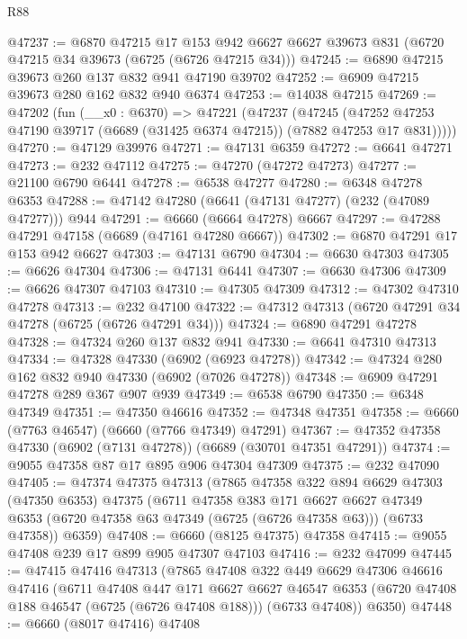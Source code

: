 \begin{lexlean}{R88}
\begin{coremodule}
@47237 := @6870
    @47215
    @17
    @153
    @942
    @6627
    @6627
    @39673
    @831
    (@6720 @47215 @34 @39673 (@6725 (@6726 @47215 @34)))
@47245 := @6890 @47215 @39673 @260 @137 @832 @941 @47190 @39702
@47252 := @6909 @47215 @39673 @280 @162 @832 @940 @6374
@47253 := @14038 @47215
@47269 := @47202
    (fun (__x0 : @6370) =>
    @47221
      (@47237
        (@47245
          (@47252 @47253 @47190 @39717 (@6689 (@31425 @6374 @47215)) (@7882 @47253 @17 @831)))))
@47270 := @47129 @39976
@47271 := @47131 @6359
@47272 := @6641 @47271
@47273 := @232 @47112
@47275 := @47270 (@47272 @47273)
@47277 := @21100 @6790 @6441
@47278 := @6538 @47277
@47280 := @6348 @47278 @6353
@47288 := @47142 @47280 (@6641 (@47131 @47277) (@232 (@47089 @47277))) @944
@47291 := @6660 (@6664 @47278) @6667
@47297 := @47288 @47291 @47158 (@6689 (@47161 @47280 @6667))
@47302 := @6870 @47291 @17 @153 @942 @6627
@47303 := @47131 @6790
@47304 := @6630 @47303
@47305 := @6626 @47304
@47306 := @47131 @6441
@47307 := @6630 @47306
@47309 := @6626 @47307 @47103
@47310 := @47305 @47309
@47312 := @47302 @47310 @47278
@47313 := @232 @47100
@47322 := @47312 @47313 (@6720 @47291 @34 @47278 (@6725 (@6726 @47291 @34)))
@47324 := @6890 @47291 @47278
@47328 := @47324 @260 @137 @832 @941
@47330 := @6641 @47310 @47313
@47334 := @47328 @47330 (@6902 (@6923 @47278))
@47342 := @47324 @280 @162 @832 @940 @47330 (@6902 (@7026 @47278))
@47348 := @6909 @47291 @47278 @289 @367 @907 @939
@47349 := @6538 @6790
@47350 := @6348 @47349
@47351 := @47350 @46616
@47352 := @47348 @47351
@47358 := @6660 (@7763 @46547) (@6660 (@7766 @47349) @47291)
@47367 := @47352 @47358 @47330 (@6902 (@7131 @47278)) (@6689 (@30701 @47351 @47291))
@47374 := @9055 @47358 @87 @17 @895 @906 @47304 @47309
@47375 := @232 @47090
@47405 := @47374
    @47375
    @47313
    (@7865
      @47358
      @322
      @894
      @6629
      @47303
      (@47350 @6353)
      @47375
      (@6711
        @47358
        @383
        @171
        @6627
        @6627
        @47349
        @6353
        (@6720 @47358 @63 @47349 (@6725 (@6726 @47358 @63)))
        (@6733 @47358))
      @6359)
@47408 := @6660 (@8125 @47375) @47358
@47415 := @9055 @47408 @239 @17 @899 @905 @47307 @47103
@47416 := @232 @47099
@47445 := @47415
    @47416
    @47313
    (@7865
      @47408
      @322
      @449
      @6629
      @47306
      @46616
      @47416
      (@6711
        @47408
        @447
        @171
        @6627
        @6627
        @46547
        @6353
        (@6720 @47408 @188 @46547 (@6725 (@6726 @47408 @188)))
        (@6733 @47408))
      @6350)
@47448 := @6660 (@8017 @47416) @47408

\end{coremodule}
\end{lexlean}

